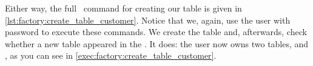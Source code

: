 Either way, the full \sql\ command for creating our table  is given in \cref{lst:factory:create_table_customer}.
Notice that we, again, use the  user with password  to execute these commands.
We create the table and, afterwards, check whether a new table appeared in the .
It does: the user  now owns two tables,  and , as you can see in \cref{exec:factory:create_table_customer}.%
%
\FloatBarrier%
\endhsection%
%
